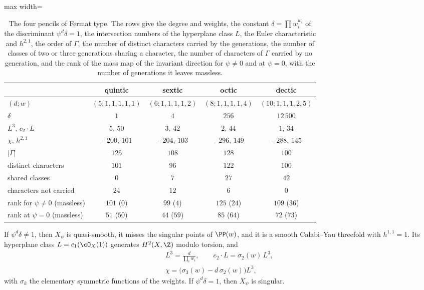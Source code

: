 \begin{table}[t]
\caption{The four pencils of Fermat type. The rows give the degree and
weights, the constant $\delta=\prod w_i^{w_i}$ of the discriminant
$\psi^d\delta=1$, the intersection numbers of the hyperplane class $L$, the
Euler characteristic and $h^{2,1}$, the order of $\Gamma$, the number of
distinct characters carried by the generations, the number of classes of
two or three generations sharing a character, the number of characters of
$\Gamma$ carried by no generation, and the rank of the mass map of the
invariant direction for $\psi\ne0$ and at $\psi=0$, with the number of
generations it leaves massless.}
\label{tab:wdata}
\centering
\begin{adjustbox}{max width=\linewidth}\begin{tabular}{lcccc}
\toprule
 & quintic & sextic & octic & dectic\\
\midrule
$(d;w)$ & $(5;1,1,1,1,1)$ & $(6;1,1,1,1,2)$ & $(8;1,1,1,1,4)$ & $(10;1,1,1,2,5)$\\
$\delta$ & $1$ & $4$ & $256$ & $12\,500$\\
$L^3$, $c_2\cdot L$ & $5$, $50$ & $3$, $42$ & $2$, $44$ & $1$, $34$\\
$\chi$, $h^{2,1}$ & $-200$, $101$ & $-204$, $103$ & $-296$, $149$ & $-288$, $145$\\
$|\Gamma|$ & $125$ & $108$ & $128$ & $100$\\
distinct characters & $101$ & $96$ & $122$ & $100$\\
shared classes & $0$ & $7$ & $27$ & $42$\\
characters not carried & $24$ & $12$ & $6$ & $0$\\
rank for $\psi\ne0$ (massless) & $101$ ($0$) & $99$ ($4$) & $125$ ($24$) & $109$ ($36$)\\
rank at $\psi=0$ (massless) & $51$ ($50$) & $44$ ($59$) & $85$ ($64$) & $72$ ($73$)\\
\bottomrule
\end{tabular}\end{adjustbox}
\end{table}

\begin{lemma}\label{lem:wsmooth}
If $\psi^d\delta\ne1$, then $X_\psi$ is quasi-smooth, it misses the singular
points of $\PP(w)$, and it is a smooth Calabi--Yau threefold with
$h^{1,1}=1$. Its hyperplane class $L=c_1(\cO_X(1))$ generates $H^2(X,\Z)$
modulo torsion, and
\begin{equation}\label{eq:wchern}
\begin{gathered}
L^3=\frac{d}{\prod_iw_i},\qquad c_2\cdot L=\sigma_2(w)\,L^3,\\
\chi=\big(\sigma_3(w)-d\,\sigma_2(w)\big)L^3,
\end{gathered}
\end{equation}
with $\sigma_k$ the elementary symmetric functions of the weights. If
$\psi^d\delta=1$, then $X_\psi$ is singular.
\end{lemma}

